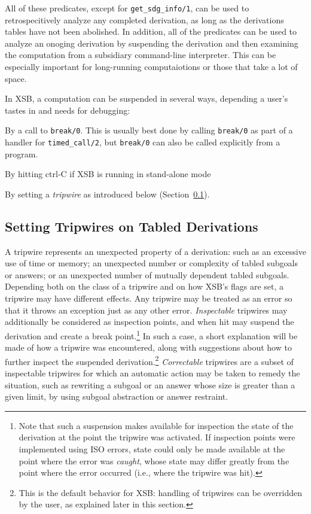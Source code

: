 All of these predicates, except for {\tt get\_sdg\_info/1}, can be
used to retrospecitively analyze any completed derivation, as long as
the derivations tables have not been abolished.  In addition, all of
the predicates can be used to analyze an onoging derivation by
suspending the derivation and then examining the computation from a
subsidiary command-line interpreter.  This can be especially important
for long-running computaiotions or those that take a lot of space.

In XSB, a computation can be suspended in several ways, depending a
user's tastes in and needs for debugging:

\bi 
\item By a call to {\tt break/0}.  This is usually best done by
  calling {\tt break/0} as part of a handler for {\tt timed\_call/2},
  but {\tt break/0} can also be called explicitly from a program.
%
\item By hitting ctrl-C if XSB is running in stand-alone mode

\item By setting a {\em tripwire} as introduced below
  (Section~\ref{sec:tripwire}).  
%
\ei

\subsection{Setting Tripwires on Tabled Derivations} \label{sec:tripwire}
%
A tripwire represents an unexpected property of a derivation: such as
an excessive use of time or memory; an unexpected number or complexity
of tabled subgoals or answers; or an unexpected number of mutually
dependent tabled subgoals.  Depending both on the class of a tripwire
and on how XSB's flags are set, a tripwire may have different effects.
Any tripwire may be treated as an error so that it throws an exception
just as any other error.  {\em Inspectable} tripwires may additionally
be considered as inspection points, and when hit may suspend the
derivation and create a break point.\footnote{Note that such a
  suspension makes available for inspection the state of the
  derivation at the point the tripwire was activated.  If inspection
  points were implemented using ISO errors, state could only be made
  available at the point where the error was {\em caught}, whose state
  may differ greatly from the point where the error occurred (i.e.,
  where the tripwire was hit).}
%
In such a case, a short explanation will be made of how a tripwire was
encountered, along with suggestions about how to further inspect the
suspended derivation.\footnote{
  This is the default behavior for XSB:
  handling of tripwires can be overridden by the user,
  as explained later in this section.
}
{\em Correctable} tripwires are a subset of
inspectable tripwires for which an automatic action may be taken to
remedy the situation, such as rewriting a subgoal or an answer whose
size is greater than a given limit, by using subgoal abstraction or
answer restraint.

